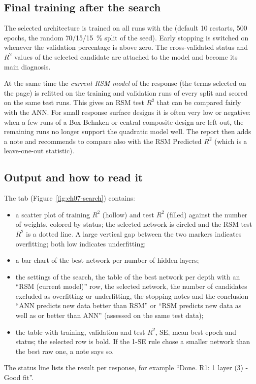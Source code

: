 \subsection{Final training after the search}\label{sec:ch07-final}

The selected architecture is trained on all runs with the  (default 10 restarts, 500
epochs, the random 70/15/15~\% split of the seed). Early stopping is switched on whenever the validation
percentage is above zero. The cross-validated status and $R^2$ values of the selected candidate are attached to
the model and become its main diagnosis.

At the same time the \emph{current RSM model} of the response (the terms selected on the  page)
is refitted on the training and validation runs of every split and scored on the same test runs. This gives an
RSM test $R^2$ that can be compared fairly with the ANN. For small response surface designs it is often very low
or negative: when a few runs of a Box-Behnken or central composite design are left out, the remaining runs no
longer support the quadratic model well. The report then adds a note and recommends to compare also with the RSM
Predicted $R^2$ (which is a leave-one-out statistic).

\subsection{Output and how to read it}

The  tab (Figure~\ref{fig:ch07-search}) contains:
\begin{itemize}
  \item a scatter plot of training $R^2$ (hollow) and test $R^2$ (filled) against the number of weights, colored
    by status; the selected network is circled and the RSM test $R^2$ is a dotted line. A large vertical gap
    between the two markers indicates overfitting; both low indicates underfitting;
  \item a bar chart of the best network per number of hidden layers;
  \item the settings of the search, the table of the best network per depth with an ``RSM (current model)'' row,
    the selected network, the number of candidates excluded as overfitting or underfitting, the stopping notes and
    the conclusion ``ANN predicts new data better than RSM'' or ``RSM predicts new data as well as or better than
    ANN'' (assessed on the same test data);
  \item the table  with training, validation and test $R^2$, SE, mean
    best epoch and status; the selected row is bold. If the 1-SE rule chose a smaller network than the best raw
    one, a note says so.
\end{itemize}
The status line lists the result per response, for example ``Done. R1: 1 layer (3) - Good fit''.

